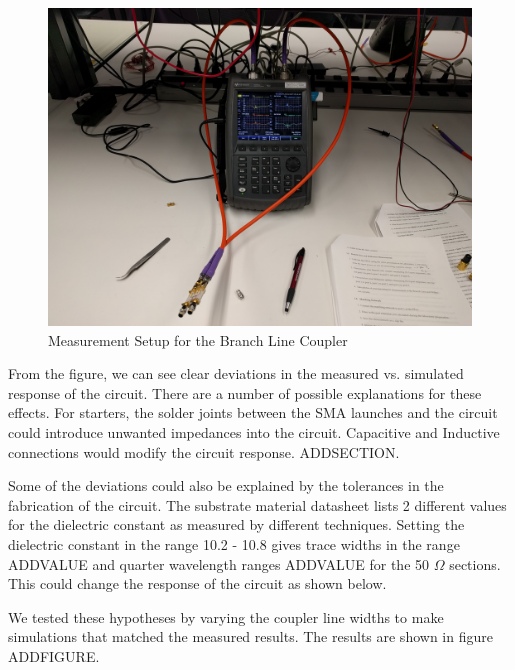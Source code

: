 \documentclass[twocolumn, aps, apl]{revtex4-1}
\begin{document}
\begin{figure}[!htbp]
    \centering
    \includegraphics[scale=0.05]{BranchImg.jpg}
    \caption{Measurement Setup for the Branch Line Coupler}
    \label{fig:branchimg}
\end{figure}


From the figure, we can see clear deviations in the measured vs. simulated response of the circuit. There are a number of possible explanations for these effects. For starters, the solder joints between the SMA launches and the circuit could introduce unwanted impedances into the circuit. Capacitive and Inductive connections would modify the circuit response. ADDSECTION.

Some of the deviations could also be explained by the tolerances in the fabrication of the circuit. The substrate material datasheet lists 2 different values for the dielectric constant as measured by different techniques. Setting the dielectric constant in the range 10.2 - 10.8 gives trace widths in the range ADDVALUE and quarter wavelength ranges ADDVALUE for the 50 $\Omega$ sections. This could change the response of the circuit as shown below. 

We tested these hypotheses by varying the coupler line widths to make simulations that matched the measured results. The results are shown in figure ADDFIGURE. 
\end{document}
